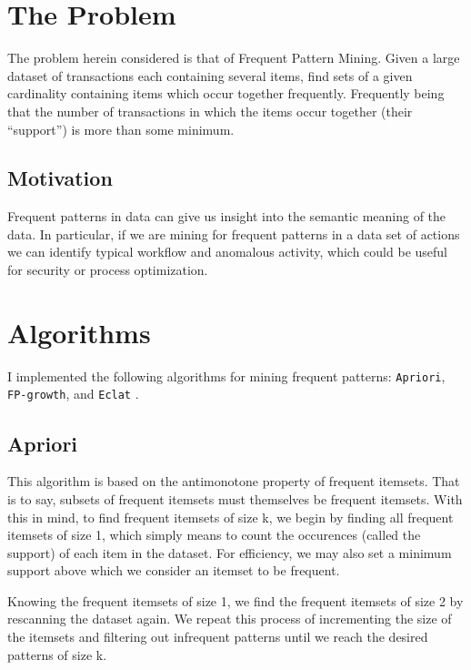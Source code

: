 \documentclass[11pt]{article}
\begin{document}
\begin{multicols}{2} %


\section{The Problem}

The problem herein considered is that of Frequent Pattern Mining.
Given a large dataset of transactions each containing several items,
find sets of a given cardinality containing items which occur together
frequently.  Frequently being that the number of transactions in which
the items occur together (their ``support'') is more than some
minimum.

\subsection{Motivation}

Frequent patterns in data can give us insight into the semantic
meaning of the data.  In particular, if we are mining for frequent
patterns in a data set of actions we can identify typical workflow and
anomalous activity, which could be useful for security or process
optimization.

\section{Algorithms}

I implemented the following algorithms for mining frequent patterns:
\texttt{Apriori}, \texttt{FP-growth}, and \texttt{Eclat}
\cite{Han2007,fpmlecture}.

\subsection{Apriori}

This algorithm is based on the antimonotone property of frequent
itemsets.  That is to say, subsets of frequent itemsets must
themselves be frequent itemsets.  With this in mind, to find frequent
itemsets of size k, we begin by finding all frequent itemsets of size
1, which simply means to count the occurences (called the support) of
each item in the dataset.  For efficiency, we may also set a minimum
support above which we consider an itemset to be frequent.

Knowing the frequent itemsets of size 1, we find the frequent itemsets
of size 2 by rescanning the dataset again.  We repeat this process of
incrementing the size of the itemsets and filtering out infrequent
patterns until we reach the desired patterns of size k.


\end{multicols}
\end{document}
